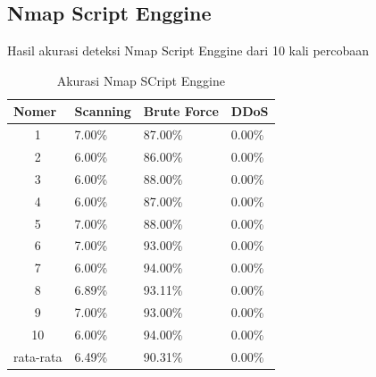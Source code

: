 \subsection{Nmap Script Enggine}
Hasil akurasi deteksi Nmap Script Enggine dari 10 kali percobaan
\begin{table}[H]
	\centering
	\caption{Akurasi Nmap SCript Enggine}
	\label{Akurasi Nmap SCript Enggine}
	\begin{tabular}{|c|l|l|l|}
		\hline
		\multicolumn{1}{|l|}{Nomer}     & Scanning & Brute Force & DDoS   \\ \hline
		1                               & 7.00\%   & 87.00\%     & 0.00\% \\ \hline
		2                               & 6.00\%   & 86.00\%     & 0.00\% \\ \hline
		3                               & 6.00\%   & 88.00\%     & 0.00\% \\ \hline
		4                               & 6.00\%   & 87.00\%     & 0.00\% \\ \hline
		5                               & 7.00\%   & 88.00\%     & 0.00\% \\ \hline
		6                               & 7.00\%   & 93.00\%     & 0.00\% \\ \hline
		7                               & 6.00\%   & 94.00\%     & 0.00\% \\ \hline
		8                               & 6.89\%   & 93.11\%     & 0.00\% \\ \hline
		9                               & 7.00\%   & 93.00\%     & 0.00\% \\ \hline
		10                              & 6.00\%   & 94.00\%     & 0.00\% \\ \hline
		\multicolumn{1}{|l|}{rata-rata} & 6.49\%   & 90.31\%     & 0.00\% \\ \hline
	\end{tabular}
\end{table}

